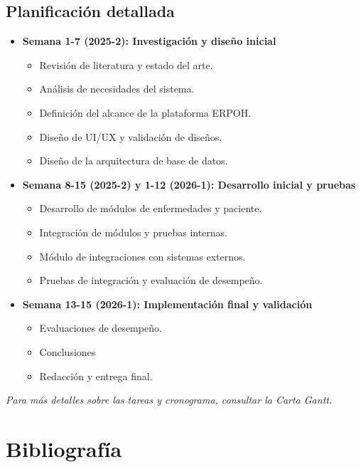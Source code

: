 \documentclass{article}
\begin{document}
\subsection{Planificación detallada}
\begin{itemize}[leftmargin=1.2em]
  \item \textbf{Semana 1-7 (2025-2): Investigación y diseño inicial}
    \begin{itemize}
        \item Revisión de literatura y estado del arte.
        \item Análisis de necesidades del sistema.
        \item Definición del alcance de la plataforma ERPOH.
        \item Diseño de UI/UX y validación de diseños.
        \item Diseño de la arquitectura de base de datos.
    \end{itemize}

  \item \textbf{Semana 8-15 (2025-2) y 1-12 (2026-1): Desarrollo inicial y pruebas}
    \begin{itemize}
        \item Desarrollo de módulos de enfermedades y paciente.
        \item Integración de módulos y pruebas internas.
        \item Módulo de integraciones con sistemas externos.
        \item Pruebas de integración y evaluación de desempeño.
    \end{itemize}

  \item \textbf{Semana 13-15 (2026-1): Implementación final y validación}
    \begin{itemize}

        \item Evaluaciones de desempeño.
                \item Conclusiones
        \item Redacción y entrega final.
    \end{itemize}
\end{itemize}

\textit{Para más detalles sobre las tareas y cronograma, consultar la Carta Gantt.}

\section{Bibliografía}
\addto\captionsspanish{\renewcommand{\refname}{Referencias}}
\end{document}
